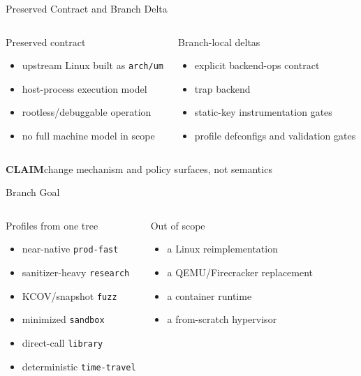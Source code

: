 \documentclass[aspectratio=169,11pt]{beamer}
\newcommand{\pill}[2]{\colorbox{#1!14}{\textcolor{#1}{\footnotesize\textbf{#2}}}}
\begin{document}
\begin{frame}{Preserved Contract and Branch Delta}
\begin{columns}[T,onlytextwidth]
\begin{block}{Preserved \UML{} contract}
\begin{itemize}
  \item upstream Linux built as \texttt{arch/um}
  \item host-process execution model
  \item rootless/debuggable operation
  \item no full machine model in scope
\end{itemize}
\end{block}
\begin{block}{Branch-local deltas}
\begin{itemize}
  \item explicit backend-ops contract
  \item \KVMvTwo{} trap backend
  \item static-key instrumentation gates
  \item profile defconfigs and validation gates
\end{itemize}
\end{block}
\end{columns}
\vspace{0.45em}
\centering
\pill{UMLBlue}{CLAIM}\quad change mechanism and policy surfaces, not \UML{} semantics
\end{frame}

\begin{frame}{Branch Goal}
\begin{columns}[T,onlytextwidth]
\begin{block}{Profiles from one tree}
\begin{itemize}
  \item near-native \texttt{prod-fast}
  \item sanitizer-heavy \texttt{research}
  \item KCOV/snapshot \texttt{fuzz}
  \item minimized \texttt{sandbox}
  \item direct-call \texttt{library}
  \item deterministic \texttt{time-travel}
\end{itemize}
\end{block}
\begin{block}{Out of scope}
\begin{itemize}
  \item a Linux reimplementation
  \item a QEMU/Firecracker replacement
  \item a container runtime
  \item a from-scratch hypervisor
\end{itemize}
\end{block}
\end{columns}
\end{frame}
\end{document}
